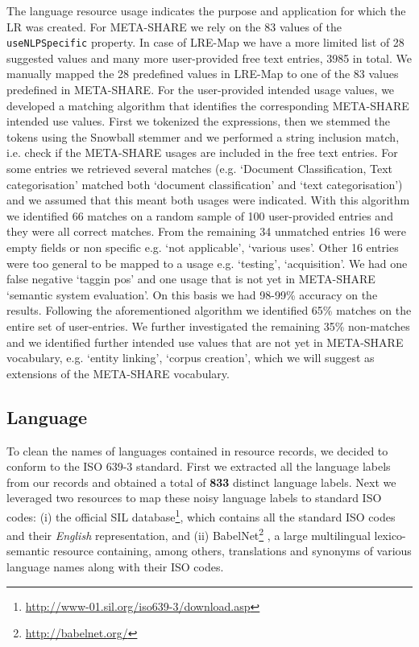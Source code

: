 \documentclass[11pt]{article}
\begin{document}
The language resource usage indicates the purpose and application for which 
the LR was created. For META-SHARE we rely on the 83 values of the 
{\tt useNLPSpecific} property. In case of LRE-Map we have a more limited list 
of 28 suggested values and many more user-provided free text entries, 3985 in
total. We manually mapped the 28 predefined values in LRE-Map to one of the 83 values predefined in META-SHARE.
For the user-provided intended usage values, we developed a matching algorithm that identifies the 
corresponding META-SHARE intended use values. First we tokenized the expressions, then we
stemmed the tokens using the Snowball stemmer and we performed a string
inclusion match, i.e. check if the META-SHARE usages are included in the
free text entries. For some entries we retrieved several matches (e.g.
`Document Classification, Text categorisation' matched both
`document classification' and `text 
categorisation') and we assumed that this meant both usages were indicated. 
With this algorithm we identified 66 matches on a random sample of 100 user-provided entries and they were all correct matches. From 
the remaining 34 unmatched entries 16 were empty fields or non specific e.g. 
`not applicable', `various uses'. Other 16 entries were too general to be 
mapped to a usage e.g. `testing', `acquisition'. We had one 
false negative `taggin pos' and one usage that is not yet in META-SHARE `semantic system evaluation'. On this basis we had 98-99\% accuracy on the results.
Following the aforementioned algorithm we identified 65\% matches on the entire 
set of user-entries. We further investigated the remaining 35\% non-matches and 
we identified further intended use values that are not yet in META-SHARE vocabulary, e.g. 
`entity linking', `corpus creation', which we will suggest as extensions of the META-SHARE 
vocabulary.

    
\subsection{Language}

To clean the names of languages contained in resource records, we decided to
conform to the ISO 639-3 standard. First we extracted all the language labels
from our records and obtained a total of \textbf{833} distinct language labels. Next we leveraged two resources to map these noisy language labels to standard ISO codes: (i) the official SIL database\footnote{\url{http://www-01.sil.org/iso639-3/download.asp}}, which contains all the standard ISO codes and their \textit{English} representation, and (ii) BabelNet\footnote{\url{http://babelnet.org/}} \cite{NavigliPonzetto:12aij}, a large multilingual lexico-semantic resource containing, among others, translations and synonyms of various language names along with their ISO codes. 
\end{document}

